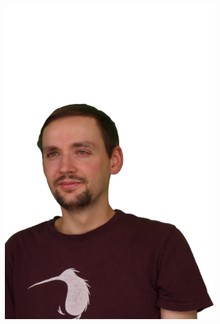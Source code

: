 \begin{figure}[!ht]
\begin{subfigure}{0.12\linewidth}
        \includegraphics[width=\textwidth]{Figures/results/initials/simon/3_render.png}
	\end{subfigure}
	\begin{subfigure}{0.12\linewidth}

\end{subfigure}
\end{figure}
